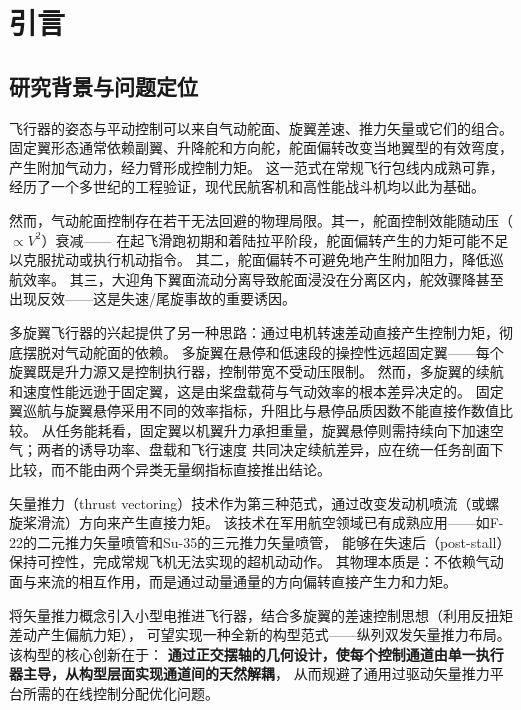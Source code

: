 \section{引言}
\label{sec:intro}

\subsection{研究背景与问题定位}

飞行器的姿态与平动控制可以来自气动舵面、旋翼差速、推力矢量或它们的组合。
固定翼形态通常依赖副翼、升降舵和方向舵，舵面偏转改变当地翼型的有效弯度，产生附加气动力，经力臂形成控制力矩。
这一范式在常规飞行包线内成熟可靠，经历了一个多世纪的工程验证，现代民航客机和高性能战斗机均以此为基础\cite{stevens2015aircraft}。

然而，气动舵面控制存在若干无法回避的物理局限。其一，舵面控制效能随动压（$\propto V^2$）衰减——
在起飞滑跑初期和着陆拉平阶段，舵面偏转产生的力矩可能不足以克服扰动或执行机动指令。
其二，舵面偏转不可避免地产生附加阻力，降低巡航效率。
其三，大迎角下翼面流动分离导致舵面浸没在分离区内，舵效骤降甚至出现反效——这是失速/尾旋事故的重要诱因。

多旋翼飞行器的兴起提供了另一种思路：通过电机转速差动直接产生控制力矩，彻底摆脱对气动舵面的依赖\cite{mahony2012multirotor}。
多旋翼在悬停和低速段的操控性远超固定翼——每个旋翼既是升力源又是控制执行器，控制带宽不受动压限制。
然而，多旋翼的续航和速度性能远逊于固定翼，这是由桨盘载荷与气动效率的根本差异决定的。
固定翼巡航与旋翼悬停采用不同的效率指标，升阻比与悬停品质因数不能直接作数值比较。
从任务能耗看，固定翼以机翼升力承担重量，旋翼悬停则需持续向下加速空气；两者的诱导功率、盘载和飞行速度
共同决定续航差异，应在统一任务剖面下比较，而不能由两个异类无量纲指标直接推出结论。

矢量推力（thrust vectoring）技术作为第三种范式，通过改变发动机喷流（或螺旋桨滑流）方向来产生直接力矩。
该技术在军用航空领域已有成熟应用——如F-22的二元推力矢量喷管和Su-35的三元推力矢量喷管，
能够在失速后（post-stall）保持可控性，完成常规飞机无法实现的超机动动作\cite{stevens2015aircraft}。
其物理本质是：不依赖气动面与来流的相互作用，而是通过动量通量的方向偏转直接产生力和力矩。

将矢量推力概念引入小型电推进飞行器，结合多旋翼的差速控制思想（利用反扭矩差动产生偏航力矩），
可望实现一种全新的构型范式——纵列双发矢量推力布局。该构型的核心创新在于：
\textbf{通过正交摆轴的几何设计，使每个控制通道由单一执行器主导，从构型层面实现通道间的天然解耦}，
从而规避了通用过驱动矢量推力平台所需的在线控制分配优化问题\cite{johansen2013control}。

